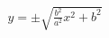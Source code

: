 \documentclass[preview]{standalone}
\begin{document}
\begin{align*}
y = \pm\sqrt{\frac{b^2}{a^2}x^2 + b^2}
\end{align*}
\end{document}
